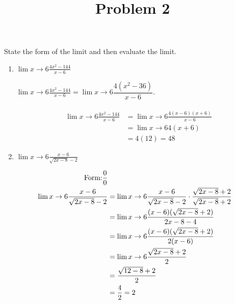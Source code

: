 \documentclass{ximera}
\title[Problem 2]{Problem 2}
\begin{document}
\begin{abstract} \end{abstract}
\maketitle


\begin{problem}
State the form of the limit and then evaluate the limit. 
	
	\begin{enumerate}
	
	\item $\displaystyle\lim{x \to 6} \frac{4x^2 - 144}{x-6}  $
\begin{explanation}
		$\displaystyle \lim{x \to 6} \frac{4x^2 - 144}{x-6} = \displaystyle \lim{x \to 6}\dfrac{4(x^2 - 36)}{x-6}$.\\
		 \hspace{0.5in} \ZeroOverZero \\ 
	\begin{align*}
	\displaystyle \lim{x \to 6} \frac{4x^2 - 144}{x-6} &= \displaystyle \lim{x \to 6} \frac{4(x-6)(x+6)}{x-6} \\
	&= \displaystyle \lim{x \to 6} 4(x+6) \\
	&= 4(12) = 48  
	\end{align*}
	\end{explanation}
	
	
	\item  $ \displaystyle \lim{x \to 6} \frac{x-6}{\sqrt{2x-8} - 2}  $
\begin{explanation}
	\begin{align*}
	\text{Form:} \dfrac{0}{0}\\
	\displaystyle \lim{x \to 6} \frac{x-6}{\sqrt{2x-8} - 2} &= \displaystyle \lim{x \to 6} \frac{x-6}{\sqrt{2x-8} - 2} \cdot \frac{\sqrt{2x-8} + 2}{\sqrt{2x-8}+2} \\
	&= \displaystyle \lim{x \to 6} \frac{(x-6)(\sqrt{2x-8} + 2)}{2x - 8 - 4} \\
	&= \displaystyle \lim{x \to 6} \frac{(x-6)(\sqrt{2x-8} + 2)}{2(x-6)} \\
	&= \displaystyle \lim{x \to 6} \frac{\sqrt{2x-8}+2}{2} \\
	&= \frac{\sqrt{12-8}+2}{2} \\
	&= \frac{4}{2} = 2
	\end{align*}
			
	\end{explanation}
	

\end{enumerate}
\end{problem}
\end{document}
